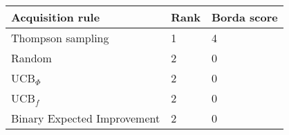 \begin{tabular}{lll}
Acquisition rule & Rank & Borda score \\ 
\hline 
Thompson sampling                             & 1 & 4 \\ 
Random                                        & 2 & 0 \\ 
UCB$_\Phi$                                    & 2 & 0 \\ 
UCB$_f$ \citep{Tesch2013}                     & 2 & 0 \\ 
Binary Expected Improvement \citep{Tesch2013} & 2 & 0 \\ 
\hline 
\end{tabular}